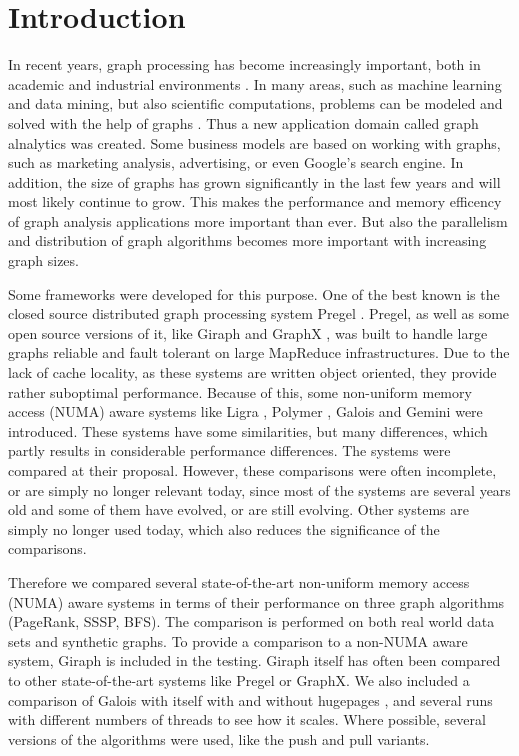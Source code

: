 \section{Introduction}

In recent years, graph processing has become increasingly important, both in academic and industrial environments \cite{Gemini}.
In many areas, such as machine learning and data mining, but also scientific computations, problems can be modeled and solved with the help of graphs \cite{Polymer}.
Thus a new application domain called graph alnalytics was created.
Some business models are based on working with graphs, such as marketing analysis, advertising, or even Google's search engine.
In addition, the size of graphs has grown significantly in the last few years and will most likely continue to grow.
This makes the performance and memory efficency of graph analysis applications more important than ever.
But also the parallelism and distribution of graph algorithms becomes more important with increasing graph sizes.

Some frameworks were developed for this purpose.
One of the best known is the closed source distributed graph processing system Pregel \cite{pregel}.
Pregel, as well as some open source versions of it, like Giraph \cite{Giraph} and GraphX \cite{graphx}, was built to handle large graphs reliable and fault tolerant on large MapReduce infrastructures.
Due to the lack of cache locality, as these systems are written object oriented, they provide rather suboptimal performance.
Because of this, some non-uniform memory access (NUMA) aware systems like Ligra \cite{Ligra}, Polymer \cite{Polymer}, Galois \cite{Galois} and Gemini \cite{Gemini} were introduced.
These systems have some similarities, but many differences, which partly results in considerable performance differences.
The systems were compared at their proposal.
However, these comparisons were often incomplete, or are simply no longer relevant today, since most of the systems are several years old and some of them have evolved, or are still evolving.
Other systems are simply no longer used today, which also reduces the significance of the comparisons.

Therefore we compared several state-of-the-art non-uniform memory access (NUMA) aware systems in terms of their performance on three graph algorithms (PageRank, SSSP, BFS).
The comparison is performed on both real world data sets and synthetic graphs.
To provide a comparison to a non-NUMA aware system, Giraph is included in the testing.
Giraph itself has often been compared to other state-of-the-art systems like Pregel or GraphX.
We also included a comparison of Galois with itself with and without hugepages \cite{hugepages}, and several runs with different numbers of threads to see how it scales.
Where possible, several versions of the algorithms were used, like the push and pull variants.

